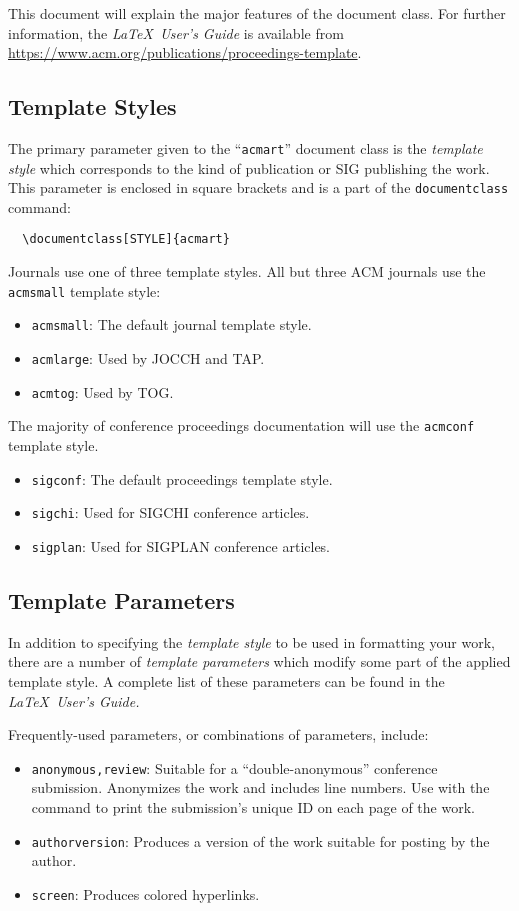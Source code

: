 \documentclass[sigplan,screen]{acmart}
\begin{document}
This document will explain the major features of the document
class. For further information, the {\itshape \LaTeX\ User's Guide} is
available from
\url{https://www.acm.org/publications/proceedings-template}.

\subsection{Template Styles}

The primary parameter given to the ``\verb|acmart|'' document class is
the {\itshape template style} which corresponds to the kind of publication
or SIG publishing the work. This parameter is enclosed in square
brackets and is a part of the {\verb|documentclass|} command:
\begin{verbatim}
  \documentclass[STYLE]{acmart}
\end{verbatim}

Journals use one of three template styles. All but three ACM journals
use the {\verb|acmsmall|} template style:
\begin{itemize}
\item {\texttt{acmsmall}}: The default journal template style.
\item {\texttt{acmlarge}}: Used by JOCCH and TAP.
\item {\texttt{acmtog}}: Used by TOG.
\end{itemize}

The majority of conference proceedings documentation will use the {\verb|acmconf|} template style.
\begin{itemize}
\item {\texttt{sigconf}}: The default proceedings template style.
\item{\texttt{sigchi}}: Used for SIGCHI conference articles.
\item{\texttt{sigplan}}: Used for SIGPLAN conference articles.
\end{itemize}

\subsection{Template Parameters}

In addition to specifying the {\itshape template style} to be used in
formatting your work, there are a number of {\itshape template parameters}
which modify some part of the applied template style. A complete list
of these parameters can be found in the {\itshape \LaTeX\ User's Guide.}

Frequently-used parameters, or combinations of parameters, include:
\begin{itemize}
\item {\texttt{anonymous,review}}: Suitable for a ``double-anonymous''
  conference submission. Anonymizes the work and includes line
  numbers. Use with the \texttt{\string\acmSubmissionID} command to print the
  submission's unique ID on each page of the work.
\item{\texttt{authorversion}}: Produces a version of the work suitable
  for posting by the author.
\item{\texttt{screen}}: Produces colored hyperlinks.
\end{itemize}
\end{document}
